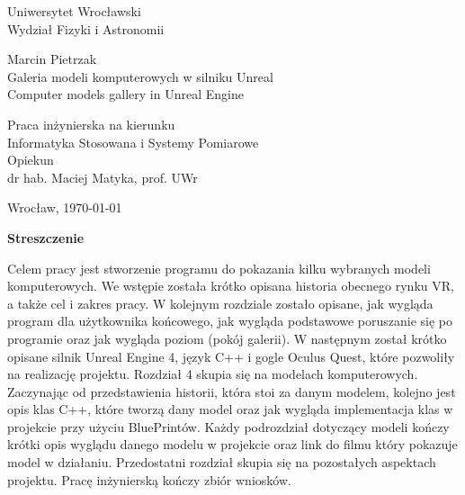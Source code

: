 \documentclass[a4paper,12pt,reqno]{article}
\begin{document}


\begin{center}

\thispagestyle{empty}

\Large 
Uniwersytet Wrocławski\\
Wydział Fizyki i Astronomii\\
\vspace{0.8cm}
\vspace{1.8cm}

\Large Marcin Pietrzak \\
\vspace{3.2cm}
\Large Galeria modeli komputerowych w silniku Unreal \\
\vspace{1.5cm}
Computer models gallery in Unreal Engine
\end{center}
\vspace{3.7cm}
\begin{flushright}

\large{ Praca inżynierska na kierunku \\Informatyka Stosowana i Systemy Pomiarowe \\}
\vspace{0.5cm}
\large{ Opiekun \\ dr hab. Maciej Matyka, prof. UWr}
\end{flushright}
\vspace{2.2cm}

\begin{center}
\large Wrocław, \today
\end{center}

\newpage

\tableofcontents

\newpage

\begin{flushleft}
\Large \textbf{Streszczenie}
\end{flushleft}
\vspace{1cm}

Celem pracy jest stworzenie programu do pokazania kilku wybranych modeli komputerowych. We wstępie została krótko opisana historia obecnego rynku VR, a także cel i zakres pracy. W kolejnym rozdziale zostało opisane, jak wygląda program dla użytkownika końcowego, jak wygląda podstawowe poruszanie się po programie oraz jak wygląda poziom (pokój galerii). W następnym został krótko opisane silnik Unreal Engine 4, język C++ i gogle Oculus Quest, które pozwoliły na realizację projektu. Rozdział 4 skupia się na modelach komputerowych. Zaczynając od przedstawienia historii, która stoi za danym modelem, kolejno jest opis klas C++, które tworzą dany model oraz jak wygląda implementacja klas w projekcie przy użyciu BluePrintów. Każdy podrozdział dotyczący modeli kończy krótki opis wyglądu danego modelu w projekcie oraz link do filmu który pokazuje model w działaniu. Przedostatni rozdział skupia się na pozostałych aspektach projektu. Pracę inżynierską kończy zbiór wniosków.
\end{document}
